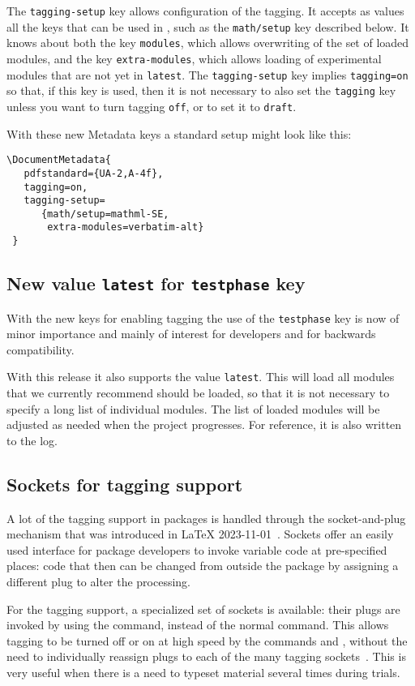 \documentclass{ltnews}
\begin{document}
The \texttt{tagging-setup} key allows configuration of the tagging. It
accepts as values all the keys that can be used in ,
such as the \texttt{math/setup} key described below. It knows about
both the key \texttt{modules}, which allows overwriting of the set of
loaded modules, and the key \texttt{extra-modules}, which allows
loading of experimental modules that are not yet in \texttt{latest}.
%
The \texttt{tagging-setup} key implies \texttt{tagging=on} so that, if
this key is used, then it is not necessary to also set the
\texttt{tagging} key unless you want to turn tagging \texttt{off}, or
to set it to \texttt{draft}.

With these new Metadata keys a standard setup might look like this:
\begin{verbatim}
\DocumentMetadata{
   pdfstandard={UA-2,A-4f},
   tagging=on,
   tagging-setup=
      {math/setup=mathml-SE,
       extra-modules=verbatim-alt}
 }      
\end{verbatim}


\subsection{New value \texttt{latest} for \texttt{testphase} key}

With the new keys for enabling tagging the use of the
\texttt{testphase} key is now of minor importance and mainly of
interest for developers and for backwards compatibility.

With this release it also supports the value \texttt{latest}.  This
will load all modules that we currently recommend should be loaded, so
that it is not necessary to specify a long list of individual
modules. The list of loaded modules will be adjusted as needed when
the project progresses. For reference, it is also written to the log.


\subsection{Sockets for tagging support}

A lot of the tagging support in packages is handled through the
socket-and-plug mechanism that was introduced in \LaTeX{}
2023-11-01~\cite[p.\,93]{41:ltnews}.
%
Sockets offer an easily used interface for package developers to
invoke variable code at pre-specified places: code that then can be
changed from outside the package by assigning a different plug to
alter the processing.

For the tagging support, a specialized set of sockets is available:
their plugs are invoked by using the  command,
instead of the normal  command. This allows tagging to
be turned off or on at high speed by the commands 
and , without the need to individually reassign
plugs to each of the many tagging
sockets~\cite[p.\,97]{41:ltnews}. This is very useful when there is a
need to typeset material several times during trials.
\end{document}
